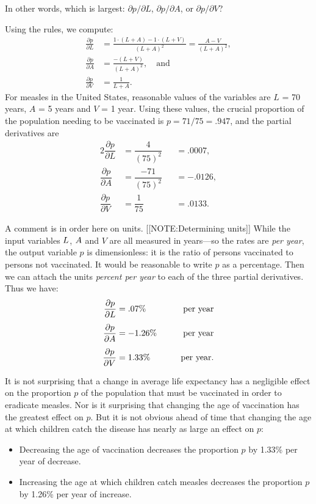 In other words, which is largest: $\partial p/\partial L$, $\partial
p/\partial A$, or $\partial p/\partial V$?

     Using the rules, we compute:
\begin{align*}
\frac{\partial p}{\partial L} &= 
   \frac{1\cdot (L+A)-1\cdot (L+V)}{(L+A)^2} = \frac{A-V}{(L+A)^2},\\
\frac{\partial p}{\partial A} &= \frac{-(L+V)}{(L+A)^2}, \quad\mbox{and}\\
\frac{\partial p}{\partial V} &= \frac{1}{L+A}. 
\end{align*}
For measles in the United States, reasonable values of the variables are $L$ = 70 years, $A$ = 5 years and $V$ = 1 year.  Using these values, the crucial proportion of the population needing to be vaccinated is $p=71/75 = .947$, and the partial derivatives are
\begin{alignat*}{2}
\dfrac{\partial p}{\partial L} &= 
    \dfrac{4}{(75)^2}   &&= .0007, \\[4pt]
\dfrac{\partial p}{\partial A} &= 
    \dfrac{-71}{(75)^2} &&= -.0126,   \\[4pt]
\dfrac{\partial p}{\partial V} &= 
    \dfrac{1}{75} &&= .0133. 
\end{alignat*}



A comment is in order here on units.  
	[[NOTE:Determining units]]
While the input variables $L\/$, $A\/$ and $V$ are all measured in years---so the rates are {\em per year\/}, the output variable $p$ is dimensionless: it is the  ratio of persons vaccinated to persons not vaccinated.  It would be reasonable to write $p$ as a percentage.  Then we can attach the units {\em percent per year\/} to each of the three partial derivatives.  Thus we have:
\begin{alignat*}{2}
\frac{\partial p}{\partial L} 
          &= .07\% \hspace{.25in} &\mbox{per year} \\[4pt]
\frac{\partial p}{\partial A} 
          &= -1.26\% \hspace{.25in} &\mbox{per year} \\[4pt]
\frac{\partial p}{\partial V} 
          &= 1.33\%  \hspace{.25in} &\mbox{per year.}
\end{alignat*}

    It is not surprising that a change in average life 
expectancy has a negligible effect on the proportion $p$ of 
the population that must be vaccinated in order to eradicate 
measles.  Nor is it surprising that changing the age of 
vaccination has the greatest effect on $p$.  But it is not 
obvious ahead of time that changing the age at which 
children catch the disease has nearly as large an effect on 
$p$:
\begin{itemize}
\item  Decreasing the age of vaccination decreases the proportion $p$ by 1.33\% per year of decrease.
\item  Increasing the age at which children catch measles decreases the proportion $p$ by 1.26\% per year of increase.
\end{itemize}

